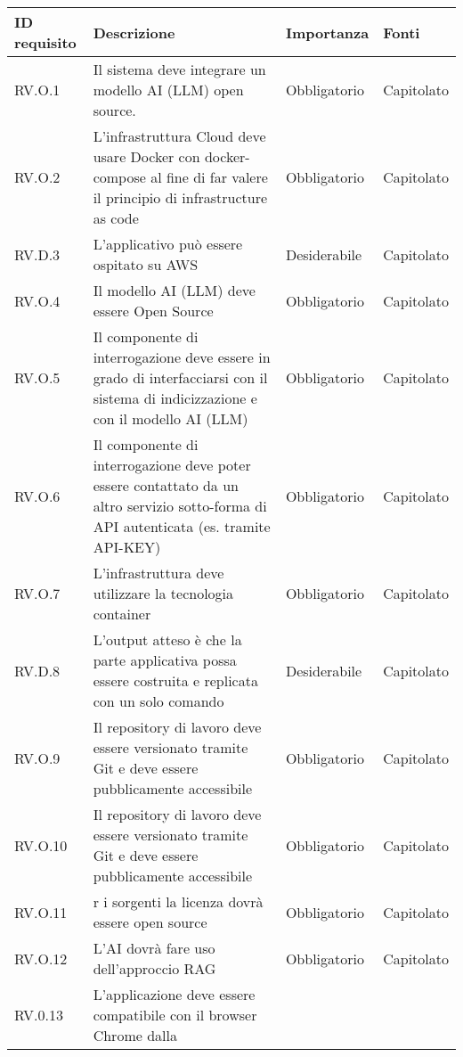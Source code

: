 
\begin{longtable}{|C{2.7cm}|L{7.2cm}|C{2.7cm}|C{2cm}|}
        \hline
    \textbf{ID requisito} & \textbf{Descrizione} & \textbf{Importanza} & \textbf{Fonti}  \\
    \hline
           RV.O.1 & Il sistema deve integrare un modello AI (LLM) open source. & Obbligatorio & Capitolato \\
          \hline 
          RV.O.2 &L’infrastruttura Cloud deve usare Docker con docker-compose al fine di far valere il principio di infrastructure as code & Obbligatorio & Capitolato \\
           \hline
          RV.D.3 & L'applicativo può essere ospitato su AWS & Desiderabile & Capitolato \\
          \hline
          RV.O.4 & Il modello AI (LLM) deve essere Open Source
         & Obbligatorio & Capitolato \\
        \hline
        RV.O.5 & Il componente di interrogazione deve essere in grado di interfacciarsi con il sistema di indicizzazione e con il modello AI (LLM)
         & Obbligatorio & Capitolato \\
        \hline
        RV.O.6 & Il componente di interrogazione deve poter essere contattato da un altro servizio sotto-forma di API autenticata (es. tramite API-KEY)
         & Obbligatorio & Capitolato \\
        \hline
        RV.O.7 &  L’infrastruttura deve utilizzare la tecnologia container
         & Obbligatorio & Capitolato \\
        \hline
         RV.D.8 & L’output atteso è che la parte applicativa possa essere costruita e replicata con un solo comando 
         & Desiderabile & Capitolato \\
        \hline
        RV.O.9 & Il repository di lavoro deve essere versionato tramite Git e deve essere pubblicamente accessibile
         & Obbligatorio & Capitolato \\
        \hline
        RV.O.10 & Il repository di lavoro deve essere versionato tramite Git e deve essere pubblicamente accessibile
         & Obbligatorio & Capitolato \\
        \hline
        RV.O.11 & r i sorgenti la licenza dovrà essere open source 
         & Obbligatorio & Capitolato \\
        \hline
        RV.O.12 & L'AI dovrà fare uso dell’approccio RAG
         & Obbligatorio & Capitolato \\
        \hline
        RV.0.13 & L’applicazione deve essere compatibile con il browser Chrome dalla

\end{longtable}
